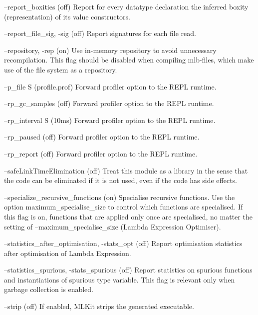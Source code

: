 \documentclass[12pt]{book}
\begin{document}
\begin{scriptcode}
--report_boxities                                        (off)
     Report for every datatype declaration the inferred boxity
     (representation) of its value constructors.

--report_file_sig, -sig                                  (off)
     Report signatures for each file read.

--repository, -rep                                        (on)
     Use in-memory repository to avoid unnecessary
     recompilation. This flag should be disabled when
     compiling mlb-files, which make use of the file system
     as a repository.

--p_file S                                       (profile.prof)
     Forward profiler option to the REPL runtime.

--rp_gc_samples                                          (off)
     Forward profiler option to the REPL runtime.

--rp_interval S                                         (10ms)
     Forward profiler option to the REPL runtime.

--rp_paused                                              (off)
     Forward profiler option to the REPL runtime.

--rp_report                                              (off)
     Forward profiler option to the REPL runtime.

--safeLinkTimeElimination                                (off)
     Treat this module as a library in the sense that
     the code can be eliminated if it is not used,
     even if the code has side effects.

--specialize_recursive_functions                          (on)
     Specialise recursive functions. Use the option
     maximum_specialise_size to control which functions
     are specialised. If this flag is on, functions that are
     applied only once are specialised, no matter the setting
     of --maximum_specialise_size (Lambda Expression Optimiser).

--statistics_after_optimisation, -stats_opt              (off)
     Report optimisation statistics after optimisation of
     Lambda Expression.

--statistics_spurious, -stats_spurious                   (off)
     Report statistics on spurious functions and instantiations
     of spurious type variable. This flag is relevant only when
     garbage collection is enabled.

--strip                                                  (off)
     If enabled, MLKit strips the generated executable.


\end{scriptcode}
\end{document}
